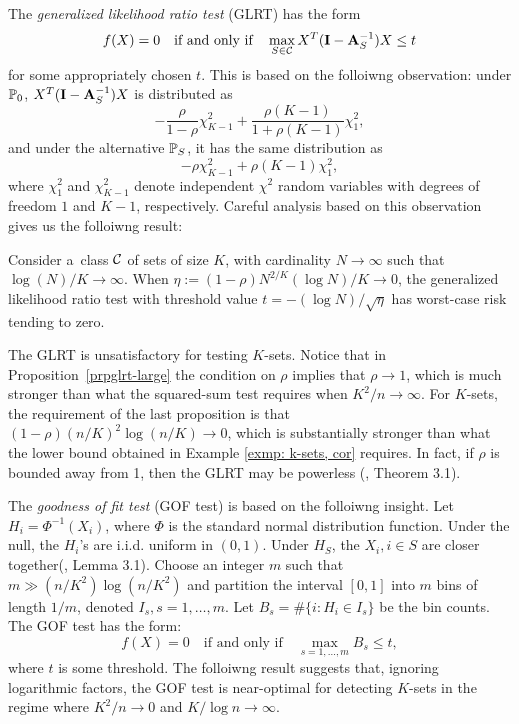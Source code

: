 \documentclass[10pt, oneside]{article}
\begin{document}
The \textit{generalized likelihood ratio test} (GLRT) has the form
\[
f(X)=0  \quad\mbox{if and only if}\quad
\max_{S \in{\mathcal C}} X^T (\mathbf{I}- \mathbf{A}_S^{-1}) X \leq t
\]
for some appropriately chosen $t$. This is based on the folloiwng observation:
under $\mathbb{P}_0$, $X^T (\mathbf{I}- \mathbf{A}_S^{-1}) X$ is distributed as
\[
- \frac{\rho}{1-\rho} \chi^2_{K-1} + \frac{\rho(K-1)}{1 + \rho(K-1)} \chi^2_1,
\]
and under the alternative $\mathbb{P}_S$, it has the same distribution as
\[
-\rho\chi^2_{K-1} + \rho(K-1) \chi^2_{1},
\]
where $\chi_1^2$ and $\chi_{K-1}^2$ denote independent $\chi^2$ random variables with degrees of freedom $1$ and $K-1$, respectively. Careful analysis based on this observation gives us the folloiwng result:

\begin{prop} \label{prpglrt-large}
Consider a~class ${\mathcal C}$ of sets of size $K$, with cardinality $N \to
\infty$ such that $\log(N)/K \to\infty$. When $\eta:= (1-\rho) N^{2/K} (\log N)/K \to0$, the
generalized likelihood ratio test with threshold value $t = -(\log N)/\sqrt{\eta}$ has
worst-case risk tending to zero.
\end{prop}

The GLRT is unsatisfactory for testing $K$-sets. Notice that in Proposition~\ref{prpglrt-large} the condition on $\rho$ implies
that $\rho \to 1$, which is much stronger than what the squared-sum test requires when $K^2/n \to\infty$.
For $K$-sets, the requirement of the last proposition is that $(1-\rho) (n/K)^2 \log(n/K) \to
0$, which is substantially stronger than what the lower bound obtained
in Example \ref{exmp: k-sets, cor} requires. In fact, if $\rho$ is bounded away from 1, then the GLRT may be powerless (\cite{arias2012correlation}, Theorem 3.1).


The \textit{goodness of fit test} (GOF test) is based on the folloiwng insight.
Let $H_i = \Phi^{-1}(X_i)$, where $\Phi$ is the standard normal distribution
function. Under the null, the $H_i$'s are i.i.d. uniform in $(0,1)$.
Under $H_S$, the $X_i, i \in S$ are closer together(\cite{arias2012correlation}, Lemma 3.1). Choose an integer $m$ such that $m \gg(n/K^2) \log(n/K^2)$ and partition the interval $[0,1]$ into $m$ bins of length $1/m$, denoted $I_s,  s =
1,\ldots, m$. Let $B_s = \# \{i: H_i \in I_s\}$ be the bin counts. The GOF test has the form:
\[
f(X)=0  \quad\mbox{if and only if}\quad
\max_{s = 1,\ldots, m} B_s \leq t,
\]
where $t$ is some threshold. The folloiwng result suggests that, ignoring logarithmic factors, the GOF test is near-optimal for detecting $K$-sets in
the regime where $K^2/n \to0$ and $K/\log n \to\infty$.
\end{document}
